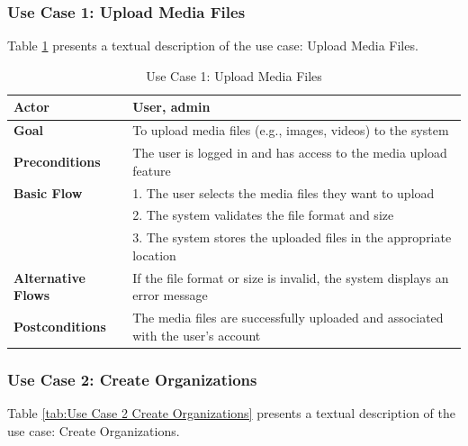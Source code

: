 \subsubsection{Use Case 1: Upload Media Files}

Table \ref{tab:Use Case 1 Upload Media Files} presents a textual description of the use case: Upload Media Files.

\begin{table}[ht]
	\centering
	\begin{tabularx}{\textwidth}{|l|X|}
		\hline
		\textbf{Actor}             & User, admin                                                                      \\
		\hline
		\textbf{Goal}              & To upload media files (e.g., images, videos) to the system                       \\
		\hline
		\textbf{Preconditions}     & The user is logged in and has access to the media upload feature                 \\
		\hline
		\textbf{Basic Flow}        & 1. The user selects the media files they want to upload                          \\
		                           & 2. The system validates the file format and size                                 \\
		                           & 3. The system stores the uploaded files in the appropriate location              \\
		\hline
		\textbf{Alternative Flows} & If the file format or size is invalid, the system displays an error message      \\
		\hline
		\textbf{Postconditions}    & The media files are successfully uploaded and associated with the user's account \\
		\hline
	\end{tabularx}
	\caption{Use Case 1: Upload Media Files}
	\label{tab:Use Case 1 Upload Media Files}
\end{table}

\subsubsection{Use Case 2: Create Organizations}

Table \ref{tab:Use Case 2 Create Organizations} presents a textual description of the use case: Create Organizations.

